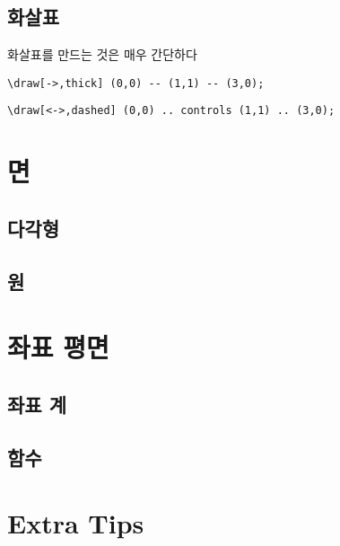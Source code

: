 \documentclass[12pt]{beamer}
\begin{document}
\subsection{화살표}
\begin{frame}[fragile]{\secname}{\subsecname}
	화살표를 만드는 것은 매우 간단하다
	\begin{lstlisting}
\draw[->,thick] (0,0) -- (1,1) -- (3,0);
	\end{lstlisting}
	
	
	\begin{lstlisting}
\draw[<->,dashed] (0,0) .. controls (1,1) .. (3,0);
	\end{lstlisting}
	

\end{frame}

\section{면}
\subsection{다각형}
\subsection{원}

\section{좌표 평면}
\subsection{좌표 계}
\subsection{함수}

\section{Extra Tips}
\end{document}
